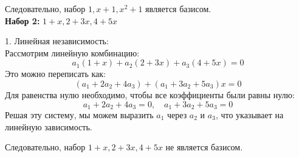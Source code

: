 \documentclass[a4paper]{article}
\begin{document}
\begin{enumerate}
\begin{enumerate}
        Следовательно, набор $ 1, x + 1, x^2 + 1 $ является базисом.\\

        
        \textbf{Набор 2:} $ 1 + x, 2 + 3x, 4 + 5x $

        1. Линейная независимость: \\
        Рассмотрим линейную комбинацию:
        $$
        a_1 (1 + x) + a_2 (2 + 3x) + a_3 (4 + 5x) = 0
        $$
        Это можно переписать как:
        $$
        (a_1 + 2a_2 + 4a_3) + (a_1 + 3a_2 + 5a_3)x = 0
        $$
        Для равенства нулю необходимо, чтобы все коэффициенты были равны нулю:
        $$
        a_1 + 2a_2 + 4a_3 = 0, \quad a_1 + 3a_2 + 5a_3 = 0
        $$
        Решая эту систему, мы можем выразить $ a_1 $ через $ a_2 $ и $ a_3 $, что указывает на линейную зависимость.

        Следовательно, набор $ 1 + x, 2 + 3x, 4 + 5x $ не является базисом.

    \end{enumerate}

\end{enumerate}
\end{document}
